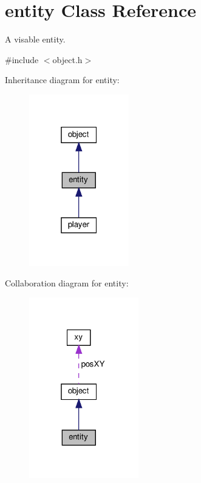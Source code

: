 \hypertarget{classentity}{}\section{entity Class Reference}
\label{classentity}


A visable entity.  




{\ttfamily \#include $<$object.\+h$>$}



Inheritance diagram for entity\+:
\nopagebreak
\begin{figure}[H]
\begin{center}
\leavevmode
\includegraphics[width=123pt]{classentity__inherit__graph}
\end{center}
\end{figure}


Collaboration diagram for entity\+:
\nopagebreak
\begin{figure}[H]
\begin{center}
\leavevmode
\includegraphics[width=135pt]{classentity__coll__graph}
\end{center}
\end{figure}
